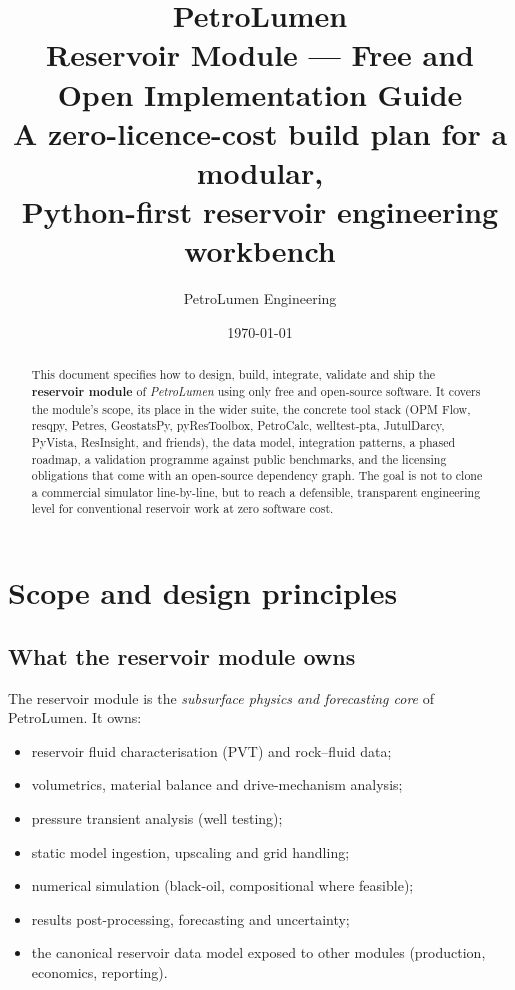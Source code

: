 \documentclass[11pt,a4paper]{article}
\title{
  \vspace{-1.5cm}
  \textbf{PetroLumen}\\[0.3em]
  \large Reservoir Module --- Free and Open Implementation Guide\\[0.5em]
  \normalsize A zero-licence-cost build plan for a modular,\\
  Python-first reservoir engineering workbench
}
\author{PetroLumen Engineering}
\date{\today}
\begin{document}
\maketitle
\thispagestyle{empty}

\begin{abstract}
\noindent
This document specifies how to design, build, integrate, validate and ship the
\textbf{reservoir module} of \emph{PetroLumen} using only free and open-source
software. It covers the module's scope, its place in the wider suite, the
concrete tool stack (OPM Flow, resqpy, Petres, GeostatsPy, pyResToolbox,
PetroCalc, welltest-pta, JutulDarcy, PyVista, ResInsight, and friends), the data
model, integration patterns, a phased roadmap, a validation programme against
public benchmarks, and the licensing obligations that come with an
open-source dependency graph. The goal is not to clone a commercial simulator
line-by-line, but to reach a defensible, transparent engineering level for
conventional reservoir work at zero software cost.
\end{abstract}

\tableofcontents
\clearpage

\section{Scope and design principles}

\subsection{What the reservoir module owns}
The reservoir module is the \emph{subsurface physics and forecasting core} of
PetroLumen. It owns:
\begin{itemize}[leftmargin=1.4em]
  \item reservoir fluid characterisation (PVT) and rock--fluid data;
  \item volumetrics, material balance and drive-mechanism analysis;
  \item pressure transient analysis (well testing);
  \item static model ingestion, upscaling and grid handling;
  \item numerical simulation (black-oil, compositional where feasible);
  \item results post-processing, forecasting and uncertainty;
  \item the canonical reservoir data model exposed to other modules
        (production, economics, reporting).
\end{itemize}
\end{document}
